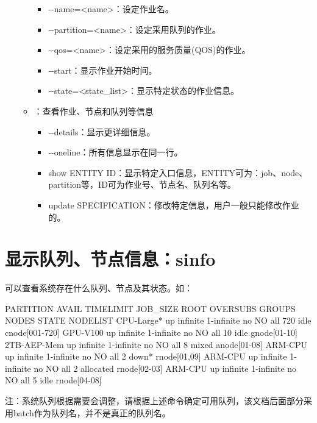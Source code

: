 \begin{itemize}
\begin{itemize}
\begin{itemize}
	\item -{}-name=<name>：设定作业名。
	\item -{}-partition=<name>：设定采用队列的作业。
	\item -{}-qos=<name>：设定采用的服务质量(QOS)的作业。	
	\item -{}-start：显示作业开始时间。
	\item -{}-state=<state\_list>：显示特定状态的作业信息。
\end{itemize}
	\item {}：查看作业、节点和队列等信息
\begin{itemize}
	\item -{}-details：显示更详细信息。
	\item -{}-oneline：所有信息显示在同一行。
	\item show ENTITY ID：显示特定入口信息，ENTITY可为：job、node、partition等，ID可为作业号、节点名、队列名等。
	\item update SPECIFICATION：修改特定信息，用户一般只能修改作业的。
\end{itemize}
\end{itemize}
\end{itemize}

\section{显示队列、节点信息：sinfo}
可以查看系统存在什么队列、节点及其状态。如：
\small
\begin{OUT}
PARTITION   AVAIL  TIMELIMIT   JOB_SIZE ROOT OVERSUBS     GROUPS  NODES       STATE NODELIST
CPU-Large*     up   infinite 1-infinite   no       NO        all    720        idle cnode[001-720]
GPU-V100       up   infinite 1-infinite   no       NO        all     10        idle gnode[01-10]
2TB-AEP-Mem    up   infinite 1-infinite   no       NO        all      8       mixed anode[01-08]
ARM-CPU        up   infinite 1-infinite   no       NO        all      2       down* rnode[01,09]
ARM-CPU        up   infinite 1-infinite   no       NO        all      2   allocated rnode[02-03]
ARM-CPU        up   infinite 1-infinite   no       NO        all      5        idle rnode[04-08]
\end{OUT}
\normalsize
\alert{注：系统队列根据需要会调整，请根据上述命令确定可用队列，该文档后面部分采用batch作为队列名，并不是真正的队列名。}
\newpage
